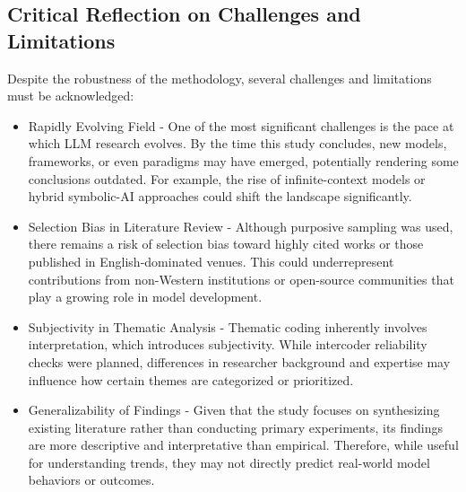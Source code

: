 \documentclass[conference]{IEEEtran}
\begin{document}
\subsection{Critical Reflection on Challenges and Limitations}
Despite the robustness of the methodology, several challenges and limitations must be acknowledged:
\begin{itemize}
    \item Rapidly Evolving Field - One of the most significant challenges is the pace at which LLM research evolves. By the time this study concludes, new models, frameworks, or even paradigms may have emerged, potentially rendering some conclusions outdated. For example, the rise of infinite-context models or hybrid symbolic-AI approaches could shift the landscape significantly.
    \item Selection Bias in Literature Review - Although purposive sampling was used, there remains a risk of selection bias toward highly cited works or those published in English-dominated venues. This could underrepresent contributions from non-Western institutions or open-source communities that play a growing role in model development.
    \item Subjectivity in Thematic Analysis - Thematic coding inherently involves interpretation, which introduces subjectivity. While intercoder reliability checks were planned, differences in researcher background and expertise may influence how certain themes are categorized or prioritized.
    \item Generalizability of Findings - Given that the study focuses on synthesizing existing literature rather than conducting primary experiments, its findings are more descriptive and interpretative than empirical. Therefore, while useful for understanding trends, they may not directly predict real-world model behaviors or outcomes.
\end{itemize}
\end{document}
